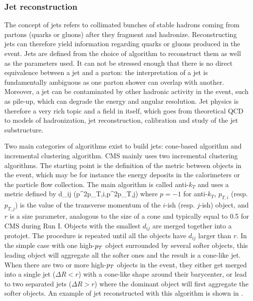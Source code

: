     \subsubsection{Jet reconstruction \label{sec:jetReconstruction}}

    The concept of jets refers to collimated bunches of stable hadrons coming from partons
    (quarks or gluons) after they fragment and hadronize. Reconstructing jets can
    therefore yield information regarding quarks or gluons produced in the event.
    Jets are defined from the choice of algorithm to reconstruct them as well as the
    parameters used. It can not be stressed enough that there is no direct equivalence
    between a jet and a parton: the interpretation of a jet is fundamentally ambiguous
    as one parton shower can overlap with another. Moreover, a jet can be contaminated by other
    hadronic activity in the event, such as pile-up, which can degrade the energy
    and angular resolution. Jet physics is therefore a very rich topic and a field
    in itself, which goes from theoretical QCD to models of hadronization, jet
    reconstruction, calibration and study of the jet substructure.

    Two main categories of algorithms exist to build jets: cone-based algorithm and
    incremental clustering algorithm. CMS mainly uses two incremental clustering
    algorithms. The starting point is the definition of the metric between objects in the
    event, which may be for instance the energy deposits in the calorimeters or the
    particle flow collection. The main algorithm is called anti-$k_T$ \cite{antiKt} and uses a metric
    defined by
    {
        d_{ij}  {}(p^{2p}_{T,i},p^{2p}_{T,j}) 
    }
    where $p = -1$ for anti-$k_T$, $p_{T,i}$ (resp. $p_{T,j}$) is the value of the transverse momentum of
    the $i$-ish (resp. $j$-ish) object, and $r$ is a size parameter, analogous to the size of a cone and
    typically equal to 0.5 for CMS during Run I. Objects with the smallest $d_{ij}$ are
    merged together into a protojet. The procedure is repeated until all the objects have
    $d_{ij}$ larger than $r$. In the
    simple case with one high-$p_T$ object surrounded by several softer objects, this
    leading object will aggregate all the softer ones and the result is a cone-like jet. When
    there are two or more high-$p_T$ objects in the event, they either get merged into
    a single jet ($\Delta R < r$) with a cone-like shape around their barycenter, or
    lead to two separated jets ($\Delta R > r$) where the dominant object will first
    aggregate the softer objects. An example of jet reconstructed with this algorithm
    is shown in .

